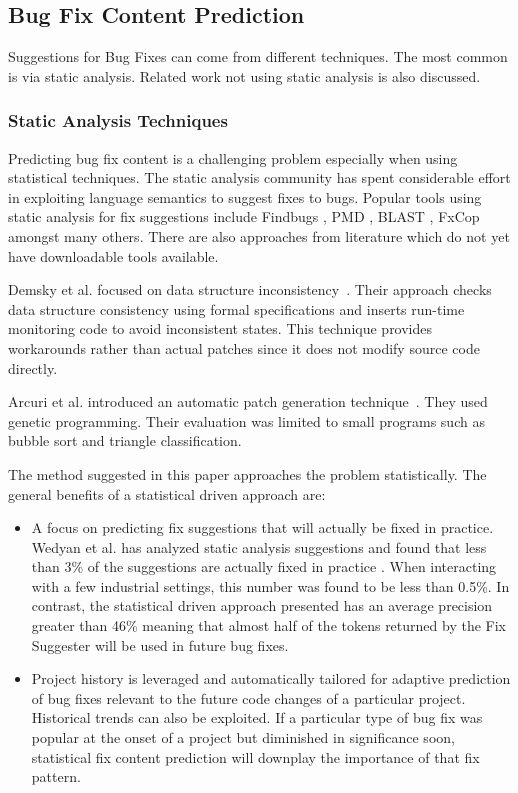 \documentclass[conference]{IEEEtran}
\begin{document}
\subsection{Bug Fix Content Prediction}

Suggestions for Bug Fixes can come from different techniques. The most common is via static analysis. Related work not using static analysis is also discussed. 

\subsubsection{Static Analysis Techniques}

Predicting bug fix content is a challenging problem especially when
using statistical techniques. The static analysis community has spent
considerable effort in exploiting language semantics to suggest fixes
to bugs. Popular tools using static analysis for fix suggestions
include Findbugs \cite{ayewah2008using}, PMD \cite{rutar2004comparison}, BLAST \cite{muhlberg2007blast}, FxCop \cite{wagner2008evaluation} amongst many others. There are also approaches from literature which do not yet have downloadable tools available. 

Demsky et al. focused on data structure
inconsistency~\cite{demsky_data_2005,demsky_inference_2006}. Their approach
checks data structure consistency using formal specifications and inserts
run-time monitoring code to avoid inconsistent states. This technique
provides workarounds rather than actual patches since it does not modify source
code directly.

Arcuri et al. introduced an automatic patch generation
technique~\cite{arcuri_automation_2008,arcuri_multi-objective_2008,arcuri_novel_2008}. They used genetic programming. Their evaluation was limited to
small programs such as bubble sort and triangle classification.

The method suggested in this paper
approaches the problem statistically. The general benefits of a statistical
driven approach are:

\begin{itemize}
\item A focus on predicting fix suggestions that will actually be fixed in practice. Wedyan et al.
has analyzed static analysis suggestions and found that less than
3\% of the suggestions are actually fixed in practice \cite{wedyan2009effectiveness}. When interacting
with a few industrial settings, this number was found to be less than
0.5\%. In contrast, the statistical driven approach presented has an average precision greater than 46\% meaning that almost half of the tokens returned by the Fix Suggester will be used in future bug fixes.  
\item Project history is leveraged and automatically tailored for adaptive
prediction of bug fixes relevant to the future code changes of a particular
project. Historical trends can also be exploited. If a particular
type of bug fix was popular at the onset of a project but diminished
in significance soon, statistical fix content prediction will downplay
the importance of that fix pattern.
\end{itemize}
\end{document}
